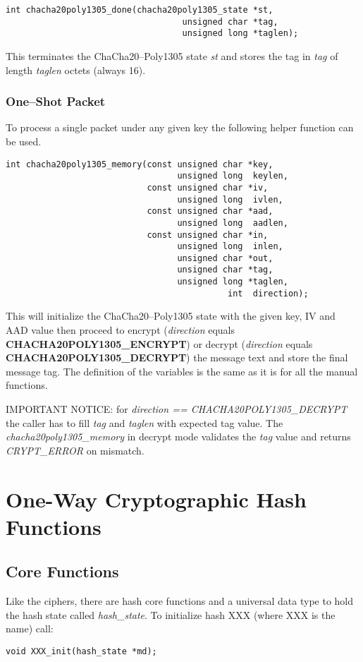 \documentclass[synpaper]{book}
\newcommand{\mysection}[1]    %
	{                   %
	\section{#1}
   \markboth{\textsf{www.libtom.net}}{\thesection ~ {#1}}
	}
\begin{document}
\begin{verbatim}
int chacha20poly1305_done(chacha20poly1305_state *st,
                                   unsigned char *tag,
                                   unsigned long *taglen);
\end{verbatim}
This terminates the ChaCha20--Poly1305 state \textit{st} and stores the tag in \textit{tag} of length \textit{taglen} octets (always 16).

\subsection{One--Shot Packet}
To process a single packet under any given key the following helper function can be used.

\begin{verbatim}
int chacha20poly1305_memory(const unsigned char *key,
                                  unsigned long  keylen,
                            const unsigned char *iv,
                                  unsigned long  ivlen,
                            const unsigned char *aad,
                                  unsigned long  aadlen,
                            const unsigned char *in,
                                  unsigned long  inlen,
                                  unsigned char *out,
                                  unsigned char *tag,
                                  unsigned long *taglen,
                                            int  direction);
\end{verbatim}
This will initialize the ChaCha20--Poly1305 state with the given key, IV and AAD value then proceed to
encrypt (\textit{direction} equals \textbf{CHACHA20POLY1305\_ENCRYPT}) or decrypt (\textit{direction} equals
\textbf{CHACHA20POLY1305\_DECRYPT}) the message text and store the final message tag. The definition of the
variables is the same as it is for all the manual functions.

IMPORTANT NOTICE: for \textit{direction == CHACHA20POLY1305\_DECRYPT} the caller has to fill \textit{tag} and \textit{taglen} with expected
tag value. The \textit{chacha20poly1305\_memory} in decrypt mode validates the \textit{tag} value and returns \textit{CRYPT\_ERROR} on mismatch.

\chapter{One-Way Cryptographic Hash Functions}
\mysection{Core Functions}
Like the ciphers, there are hash core functions and a universal data type to hold the hash state called \textit{hash\_state}.  To initialize hash
XXX (where XXX is the name) call:
\begin{verbatim}
void XXX_init(hash_state *md);
\end{verbatim}
\end{document}
